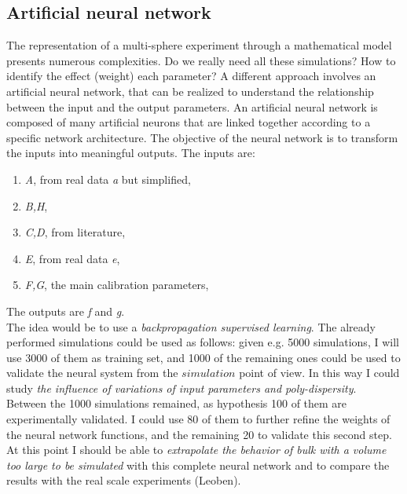 \subsection{Artificial neural network}
\label{subsection:artificialneuralnetwork}

The representation of a multi-sphere experiment through a mathematical model presents numerous complexities.
Do we really need all these simulations?
How to identify the effect (weight) each parameter?
A different approach involves an artificial neural network, that can be realized to understand the relationship between the input and the output parameters.
An artificial neural network is composed of many artificial neurons that are linked together according to a specific network architecture. The objective of the neural network is to transform the inputs into meaningful outputs.
The inputs are:
\begin{enumerate}
\item{\textit{A}, from real data \textit{a} but simplified,}
\item{\textit{B,H},}
\item{\textit{C,D}, from literature,}
\item{\textit{E}, from real data \textit{e},}
\item{\textit{F,G}, the main calibration parameters,}
\end{enumerate}

The outputs are \textit{f} and \textit{g}.\\

The idea would be to use a \textit{backpropagation supervised learning}. The already performed simulations could be used as follows: given e.g. 5000 simulations, I will use 3000 of them as training set, and 1000 of the remaining ones could be used to validate the neural system from the $simulation$ point of view.
In this way I could study \textit{the influence of variations of input parameters and poly-dispersity}.\\

Between the 1000 simulations remained, as hypothesis 100 of them are experimentally validated. I could use 80 of them to further refine the weights of the neural network functions, and the remaining 20 to validate this second step. At this point I should be able to \textit{extrapolate the behavior of bulk with a volume too large to be simulated} with this complete neural network and to compare the results with the real scale experiments (Leoben).\\

